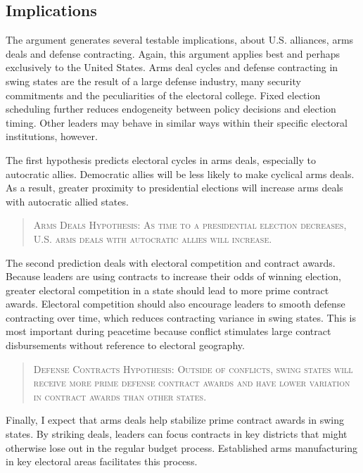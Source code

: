 \documentclass[12pt]{article}
\begin{document}
\subsection{Implications}



The argument generates several testable implications, about U.S. alliances, arms deals and defense contracting. 
Again, this argument applies best and perhaps exclusively to the United States.  
Arms deal cycles and defense contracting in swing states are the result of a large defense industry, many security commitments and the peculiarities of the electoral college. 
Fixed election scheduling further reduces endogeneity between policy decisions and election timing. 
Other leaders may behave in similar ways within their specific electoral institutions, however. 


The first hypothesis predicts electoral cycles in arms deals, especially to autocratic allies.
Democratic allies will be less likely to make cyclical arms deals. 
As a result, greater proximity to presidential elections will increase arms deals with autocratic allied states. 


\begin{quote}
\textsc{Arms Deals Hypothesis: As time to a presidential election decreases, U.S. arms deals with autocratic allies will increase.}
\end{quote}


The second prediction deals with electoral competition and contract awards. 
Because leaders are using contracts to increase their odds of winning election, greater electoral competition in a state should lead to more prime contract awards.
Electoral competition should also encourage leaders to smooth defense contracting over time, which reduces contracting variance in swing states. 
This is most important during peacetime because conflict stimulates large contract disbursements without reference to electoral geography. 
 

\begin{quote}
\textsc{Defense Contracts Hypothesis: Outside of conflicts, swing states will receive more prime defense contract awards and have lower variation in contract awards than other states.}
\end{quote}


Finally, I expect that arms deals help stabilize prime contract awards in swing states.
By striking deals, leaders can focus contracts in key districts that might otherwise lose out in the regular budget process. 
Established arms manufacturing in key electoral areas facilitates this process. 
\end{document}
